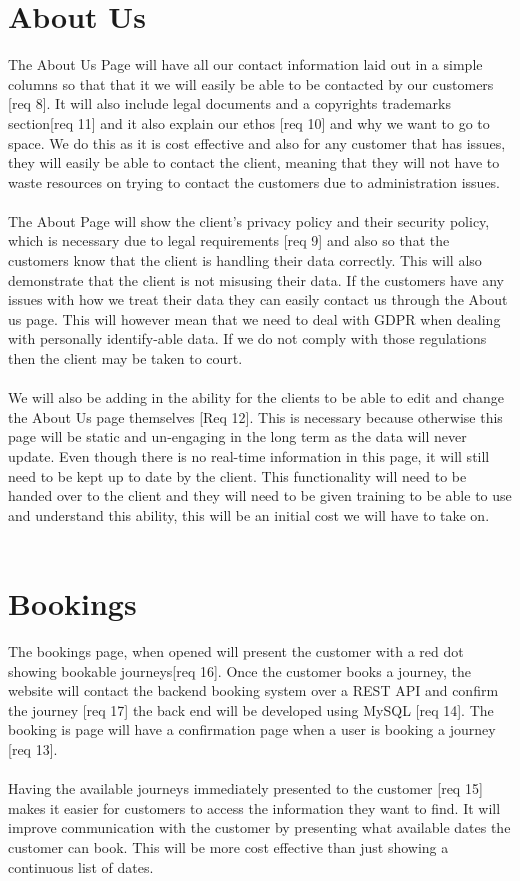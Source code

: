 \documentclass{article}
\begin{document}
\section{About Us}

The About Us Page will have all our contact information laid out in a simple columns so that that it we will easily be able to be contacted by our customers [req 8]. It will also include legal documents and a copyrights trademarks section[req 11] and it also explain our ethos [req 10] and why we want to go to space. We do this as it is cost effective and also for any customer that has issues, they will easily be able to contact the client, meaning that they will not have to waste resources on trying to contact the customers due to administration issues.
\\
\\
The About Page will show the client's privacy policy and their security policy, which is necessary due to legal requirements [req 9] and also so that the customers know that the client is handling their data correctly. This will also demonstrate that the client is not misusing their data. If the customers have any issues with how we treat their data they can easily contact us through the About us page. This will however mean that we need to deal with GDPR when dealing with personally identify-able data. If we do not comply with those regulations then the client may be taken to court.
\\
\\
We will also be adding in the ability for the clients to be able to edit and change the About Us page themselves [Req 12]. This is necessary because otherwise this page will be static and un-engaging in the long term as the data will never update. Even though there is no real-time information in this page, it will still need to be kept up to date by the client. This functionality will need to be handed over to the client and they will need to be given training to be able to use and understand this ability, this will be an initial cost we will have to take on.
\\
\\

\section{Bookings}

The bookings page, when opened will present the customer with a red dot showing bookable journeys[req 16]. Once the customer books a journey, the website will contact the backend booking system over a REST API and confirm the journey [req 17] the back end will be developed using MySQL [req 14]. The booking is page will have a confirmation page when a user is booking a journey [req 13].
\\
\\
Having the available journeys immediately presented to the customer [req 15] makes it easier for customers to access the information they want to find. It will improve communication with the customer by presenting what available dates the customer can book. This will be more cost effective than just showing a continuous list of dates.
\\
\\
\end{document}
